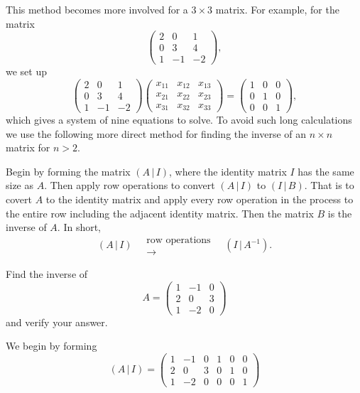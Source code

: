 \documentclass{ximera}
\begin{document}
This method becomes more involved for a $3\times 3$ matrix. For example, for the matrix
\[
\left(\begin{array}{ccc}
  2 &  0 & 1 \\
  0 &  3 & 4 \\
  1 & -1 & -2
\end{array}\right),
\]
 we set up
 \[
\left(\begin{array}{ccc}
  2 &  0 & 1 \\
  0 &  3 & 4 \\
  1 & -1 & -2
\end{array}\right) \left(\begin{array}{ccc}
  x_{11} &  x_{12} & x_{13} \\
 x_{21} &  x_{22} & x_{23} \\
  x_{31} &  x_{32} & x_{33}
\end{array}\right)
= \left(\begin{array}{ccc}
  1 &  0 & 0 \\
  0 &  1 & 0 \\
  0 & 0 & 1
\end{array}\right),
\]
which gives a system of nine equations to solve. To avoid such long calculations we use the following more direct method for finding the inverse of an $n\times n$ matrix for $n>2$.

Begin by forming the matrix $(A\,|\,I)$, where the identity matrix $I$ has the same size as $A$. Then apply row operations to convert $(A\,|\,I)$ to $(I\,|\,B)$. That is to covert $A$ to the identity matrix and apply every row operation in the process to the entire row including the adjacent identity matrix. Then the matrix $B$ is the inverse of $A$. In short,
\begin{equation}\label{method}
  (A \,|\, I)
  \quad
  \begin{matrix}
    \scriptstyle{\text{row operations}} \\ \longrightarrow
  \end{matrix}
  \quad
  (I \,|\, A^{-1}).
\end{equation}

 \begin{example}
Find the inverse of
 \[A= \left(\begin{array}{ccc}
  1 &  -1 & 0 \\
  2 &  0 & 3 \\
  1 & -2 & 0
\end{array}\right)
\]
and verify your answer.
\begin{prompt}
We begin by forming
\[
(A\,|\,I)= \left(\begin{array}{ccc|ccc}
  1 &  -1 & 0 & 1 &0 &0 \\
  2 &  0 & 3 & 0 &1 &0\\
  1 & -2 & 0 & 0 &0 &1
\end{array}\right)
\]
\end{prompt}
\end{example}
\end{document}
